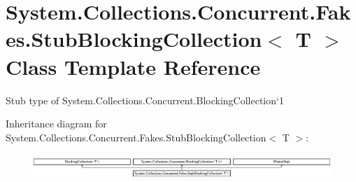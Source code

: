 \hypertarget{class_system_1_1_collections_1_1_concurrent_1_1_fakes_1_1_stub_blocking_collection_3_01_t_01_4}{\section{System.\-Collections.\-Concurrent.\-Fakes.\-Stub\-Blocking\-Collection$<$ T $>$ Class Template Reference}
\label{class_system_1_1_collections_1_1_concurrent_1_1_fakes_1_1_stub_blocking_collection_3_01_t_01_4}
}


Stub type of System.\-Collections.\-Concurrent.\-Blocking\-Collection`1 


Inheritance diagram for System.\-Collections.\-Concurrent.\-Fakes.\-Stub\-Blocking\-Collection$<$ T $>$\-:\begin{figure}[H]
\begin{center}
\leavevmode
\includegraphics[height=0.942761cm]{class_system_1_1_collections_1_1_concurrent_1_1_fakes_1_1_stub_blocking_collection_3_01_t_01_4}
\end{center}
\end{figure}
